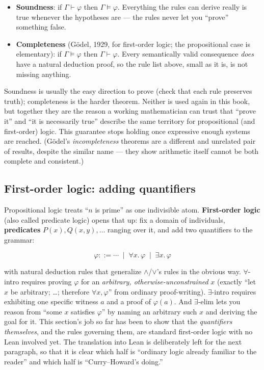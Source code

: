 \begin{itemize}
\tightlist
\item
  \textbf{Soundness}: if \(\Gamma \vdash \varphi\) then \(\Gamma \models \varphi\). Everything the rules can derive really is true whenever the hypotheses are --- the rules never let you ``prove'' something false.
\item
  \textbf{Completeness} (Gödel, 1929, for first-order logic; the propositional case is elementary): if \(\Gamma \models \varphi\) then \(\Gamma \vdash
  \varphi\). Every semantically valid consequence \emph{does} have a natural deduction proof, so the rule list above, small as it is, is not missing anything.
\end{itemize}

Soundness is usually the easy direction to prove (check that each rule preserves truth); completeness is the harder theorem. Neither is used again in this book, but together they are the reason a working mathematician can trust that ``prove it'' and ``it is necessarily true'' describe the same territory for propositional (and first-order) logic. This guarantee stops holding once expressive enough systems are reached. (Gödel's \emph{incompleteness} theorems are a different and unrelated pair of results, despite the similar name --- they show arithmetic itself cannot be both complete and consistent.)

\subsection{First-order logic: adding quantifiers}\label{sec:03-propositions-and-proofs:02-logic-recap:7}

Propositional logic treats ``\(n\) is prime'' as one indivisible atom. \textbf{First-order logic} (also called predicate logic) opens that up: fix a domain of individuals, \textbf{predicates} \(P(x), Q(x, y), \dots\) ranging over it, and add two quantifiers to the grammar:

\[
\varphi ::= \cdots \;\mid\; \forall x.\, \varphi \;\mid\; \exists x.\, \varphi
\]

with natural deduction rules that generalize \(\wedge\)/\(\vee\)'s rules in the obvious way. \(\forall\)-intro requires proving \(\varphi\) for an \emph{arbitrary, otherwise-unconstrained} \(x\) (exactly ``let \(x\) be arbitrary; \ldots; therefore \(\forall x, \varphi\)'' from ordinary proof-writing). \(\exists\)-intro requires exhibiting one specific witness \(a\) and a proof of \(\varphi(a)\). And \(\exists\)-elim lets you reason from ``some \(x\) satisfies \(\varphi\)'' by naming an arbitrary such \(x\) and deriving the goal for it. This section's job so far has been to show that the \emph{quantifiers themselves}, and the rules governing them, are standard first-order logic with no Lean involved yet. The translation into Lean is deliberately left for the next paragraph, so that it is clear which half is ``ordinary logic already familiar to the reader'' and which half is ``Curry--Howard's doing.''

